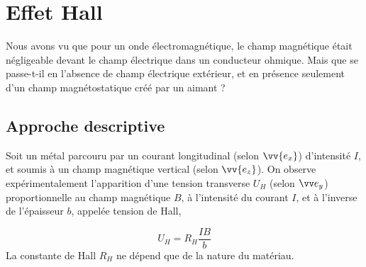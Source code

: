 \documentclass[12pt,fancy]{cours}%
\begin{document}
%

\section{Effet Hall}
Nous avons vu que pour un onde électromagnétique, le champ magnétique était négligeable devant le champ électrique dans un conducteur ohmique. Mais que se passe-t-il en l'absence de champ électrique extérieur, et en présence seulement d'un champ magnétostatique créé par un aimant ? %

\subsection{Approche descriptive}

Soit un métal parcouru par un courant longitudinal (selon $\vv{e_x}$) d'intensité $I$, et soumis à un champ magnétique vertical (selon $\vv{e_z}$). On observe expérimentalement l'apparition d'une tension transverse $U_H$ (selon $\ey$) proportionnelle au champ magnétique $B$, à l'intensité du courant $I$, et à l'inverse de l'épaisseur $b$, appelée tension de Hall,
\begin{theorem}\label{form:}
  \begin{equation*}
    U_H  = R_H \frac{IB}{b}
  \end{equation*}
  La constante de Hall $R_H$ ne dépend que de la nature du matériau.
\end{theorem}
\end{document}
